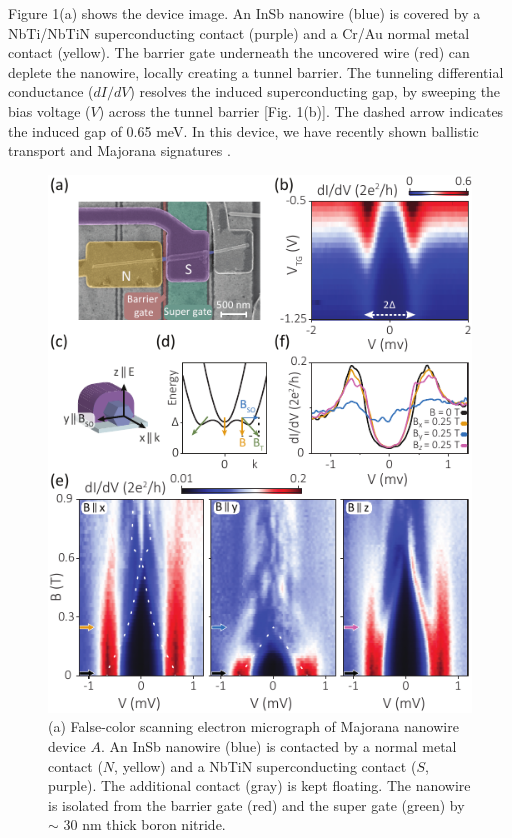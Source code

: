 Figure 1(a) shows the device image.
An InSb nanowire (blue) is covered by a NbTi/NbTiN superconducting contact (purple) and a Cr/Au normal metal contact (yellow).
The barrier gate underneath the uncovered wire (red) can deplete the nanowire, locally creating a tunnel barrier.
The tunneling differential conductance ($dI/dV$) resolves the induced superconducting gap, by sweeping the bias voltage ($V$) across the tunnel barrier [Fig. 1(b)].
The dashed arrow indicates the induced gap of 0.65 meV.
In this device, we have recently shown ballistic transport and Majorana signatures \cite{BalMaj}.
\begin{figure}
\includegraphics[width=\columnwidth]{chapter_spinorbit/figures/Fig1.pdf}
\caption{\label{fig:fig1}
(a) False-color scanning electron micrograph of Majorana nanowire device $A$.
An InSb nanowire (blue) is contacted by a normal metal contact ($N$, yellow) and a NbTiN superconducting contact ($S$, purple).
The additional contact (gray) is kept floating.
The nanowire is isolated from the barrier gate (red) and the super gate (green) by $\sim$ 30 nm thick boron nitride.
}
\end{figure}
